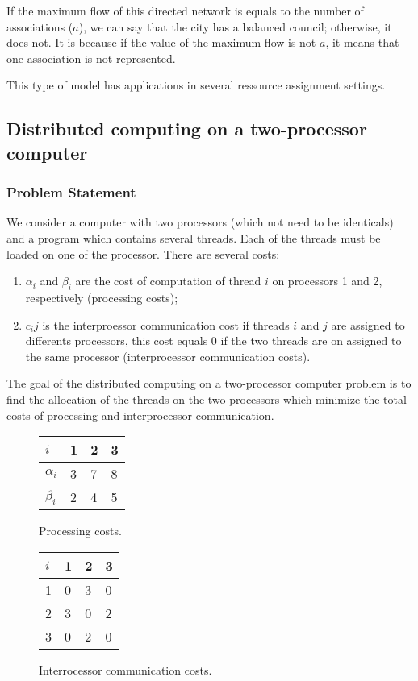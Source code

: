 If the maximum flow of this directed network is equals to the number of associations ($a$), we can say that the city has a balanced council; otherwise, it does not. It is because if the value of the maximum flow is not $a$, it means that one association is not represented.

This type of model has applications in several ressource assignment settings.


\subsection{Distributed computing on a two-processor computer}

\subsubsection{Problem Statement}
We consider a computer with two processors (which not need to be identicals) and a program which contains several threads. Each of the threads must be loaded on one of the processor. There are several costs:
\begin{enumerate}
	\item $\alpha_i$ and $\beta_i$ are the cost of computation of thread $i$ on processors 1 and 2, respectively (processing costs);
	\item $c_ij$ is the interproessor communication cost if threads $i$ and $j$ are assigned to differents processors, this cost equals $0$ if the two threads are on assigned to the same processor (interprocessor communication costs).
\end{enumerate}
The goal of the distributed computing on a two-processor computer problem is to find the allocation of the threads on the two processors which minimize the total costs of processing and interprocessor communication.

\begin{figure}[H]
\centering
\begin{tabular}{|l|l|l|l|}
	\hline
	$i$ & 1 & 2 & 3 \\
	\hline
	$\alpha_i$ & 3 & 7 & 8 \\
	\hline
	$\beta_i$ & 2 & 4 & 5 \\
	\hline
\end{tabular}
\caption{Processing costs.}
\end{figure}

\begin{figure}[H]
\begin{tabular}{|l|l|l|l|}
	\hline
	$i$ & 1 & 2 & 3 \\
	\hline
	1 & 0 & 3 & 0 \\
	\hline
	2 & 3 & 0 & 2 \\
	\hline
	3 & 0 & 2 & 0 \\
	\hline
\end{tabular}
\centering
\caption{Interrocessor communication costs.}
\end{figure}


